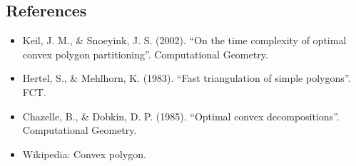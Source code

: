 \subsection{References}

\begin{itemize}
\item Keil, J. M., \& Snoeyink, J. S. (2002). ``On the time complexity of optimal convex polygon partitioning''. Computational Geometry.
\item Hertel, S., \& Mehlhorn, K. (1983). ``Fast triangulation of simple polygons''. FCT.
\item Chazelle, B., \& Dobkin, D. P. (1985). ``Optimal convex decompositions''. Computational Geometry.
\item Wikipedia: Convex polygon.
\end{itemize}
